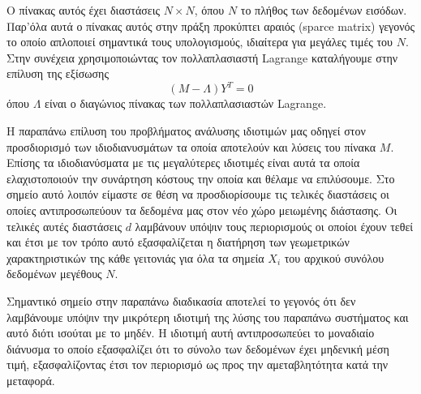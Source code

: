 Ο πίνακας αυτός έχει διαστάσεις $N \times N$, όπου $N$ το πλήθος των δεδομένων εισόδων. Παρ'όλα αυτά ο πίνακας αυτός στην πράξη προκύπτει αραιός \textlatin{(sparce matrix)} γεγονός το οποίο απλοποιεί σημαντικά τους υπολογισμούς, ιδιαίτερα για μεγάλες τιμές του $N$. Στην συνέχεια χρησιμοποιώντας τον πολλαπλασιαστή \textlatin{Lagrange} καταλήγουμε στην επίλυση της εξίσωσης
\begin{equation}
        (M-\Lambda)Y^{T} = 0
\end{equation}
\hspace*{\fill}\newline
όπου $\Lambda$ είναι ο διαγώνιος πίνακας των πολλαπλασιαστών \textlatin{Lagrange}. 
\par
Η παραπάνω επίλυση του προβλήματος ανάλυσης ιδιοτιμών μας οδηγεί στον προσδιορισμό των ιδιοδιανυσμάτων τα οποία αποτελούν και λύσεις του πίνακα $M$. Επίσης τα ιδιοδιανύσματα με τις μεγαλύτερες ιδιοτιμές είναι αυτά τα οποία ελαχιστοποιούν την συνάρτηση κόστους την οποία και θέλαμε να επιλύσουμε. Στο σημείο αυτό λοιπόν είμαστε σε θέση να προσδιορίσουμε τις τελικές διαστάσεις οι οποίες αντιπροσωπεύουν τα δεδομένα μας στον νέο χώρο μειωμένης διάστασης. Οι τελικές αυτές διαστάσεις $d$ λαμβάνουν υπόψιν τους περιορισμούς οι οποίοι έχουν τεθεί και έτσι με τον τρόπο αυτό εξασφαλίζεται η διατήρηση των γεωμετρικών χαρακτηριστικών της κάθε γειτονιάς για όλα τα σημεία $X_{i}$ του αρχικού συνόλου δεδομένων μεγέθους $N$. 
\par
Σημαντικό σημείο στην παραπάνω διαδικασία αποτελεί το γεγονός ότι δεν λαμβάνουμε υπόψιν την μικρότερη ιδιοτιμή της λύσης του παραπάνω συστήματος και αυτό διότι ισούται με το μηδέν. Η ιδιοτιμή αυτή αντιπροσωπεύει το μοναδιαίο διάνυσμα το οποίο εξασφαλίζει ότι το σύνολο των δεδομένων έχει μηδενική μέση τιμή, εξασφαλίζοντας έτσι τον περιορισμό ως προς την αμεταβλητότητα κατά την μεταφορά.
\par
